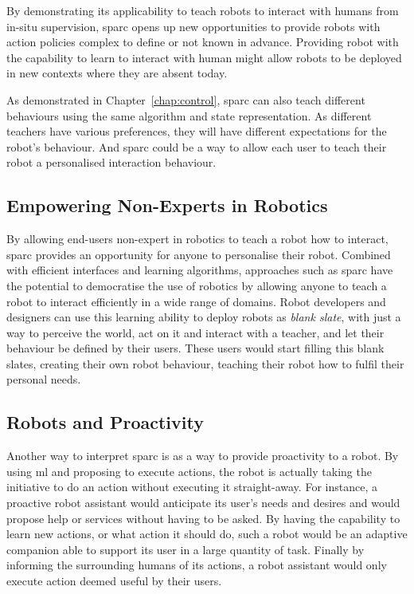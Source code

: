 By demonstrating its applicability to teach robots to interact with humans from in-situ supervision, \gls{sparc} opens up new opportunities to provide robots with action policies complex to define or not known in advance. Providing robot with the capability to learn to interact with human might allow robots to be deployed in new contexts where they are absent today.

As demonstrated in Chapter~\ref{chap:control}, \gls{sparc} can also teach different behaviours using the same algorithm and state representation. As different teachers have various preferences, they will have different expectations for the robot's behaviour. And \gls{sparc} could be a way to allow each user to teach their robot a personalised interaction behaviour.


\subsection{Empowering Non-Experts in Robotics}

By allowing end-users non-expert in robotics to teach a robot how to interact, \gls{sparc} provides an opportunity for anyone to personalise their robot. Combined with efficient interfaces and learning algorithms, approaches such as \gls{sparc} have the potential to democratise the use of robotics by allowing anyone to teach a robot to interact efficiently in a wide range of domains. Robot developers and designers can use this learning ability to deploy robots as \emph{blank slate}, with just a way to perceive the world, act on it and interact with a teacher, and let their behaviour be defined by their users. These users would start filling this blank slates, creating their own robot behaviour, teaching their robot how to fulfil their personal needs.

\subsection{Robots and Proactivity}

Another way to interpret \gls{sparc} is as a way to provide proactivity to a robot. By using \gls{ml} and proposing to execute actions, the robot is actually taking the initiative to do an action without executing it straight-away. For instance, a proactive robot assistant would anticipate its user's needs and desires and would propose help or services without having to be asked. By having the capability to learn new actions, or what action it should do, such a robot would be an adaptive companion able to support its user in a large quantity of task. Finally by informing the surrounding humans of its actions, a robot assistant would only execute action deemed useful by their users.

